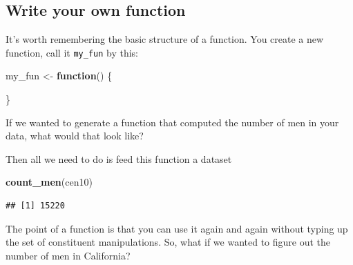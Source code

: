\documentclass[]{book}
\newenvironment{Shaded}{\begin{snugshade}}{\end{snugshade}}
\newcommand{\ControlFlowTok}[1]{\textcolor[rgb]{0.13,0.29,0.53}{\textbf{#1}}}
\newcommand{\KeywordTok}[1]{\textcolor[rgb]{0.13,0.29,0.53}{\textbf{#1}}}
\newcommand{\NormalTok}[1]{#1}
\newcommand{\OperatorTok}[1]{\textcolor[rgb]{0.81,0.36,0.00}{\textbf{#1}}}
\newcommand{\StringTok}[1]{\textcolor[rgb]{0.31,0.60,0.02}{#1}}
\theoremstyle{definition}
\theoremstyle{definition}
\theoremstyle{definition}
\theoremstyle{remark}
\begin{document}
\begin{Shaded}
\begin{Highlighting}[]
\begin{Shaded}
\begin{Highlighting}[]
\begin{Shaded}
\begin{Highlighting}[]
{\subsection{Write your own function}\label{write-your-own-function}}

It's worth remembering the basic structure of a function. You create a new function, call it \texttt{my\_fun} by this:

\begin{Shaded}
\begin{Highlighting}[]
\NormalTok{my_fun <-}\StringTok{ }\ControlFlowTok{function}\NormalTok{() \{}
  
\NormalTok{\}}
\end{Highlighting}
\end{Shaded}

If we wanted to generate a function that computed the number of men in your data, what would that look like?

\begin{Shaded}
\end{Shaded}

Then all we need to do is feed this function a dataset

\begin{Shaded}
\begin{Highlighting}[]
\KeywordTok{count_men}\NormalTok{(cen10)}
\end{Highlighting}
\end{Shaded}

\begin{verbatim}
## [1] 15220
\end{verbatim}

The point of a function is that you can use it again and again without typing up the set of constituent manipulations. So, what if we wanted to figure out the number of men in California?

\begin{Shaded}
\end{Shaded}


\end{Highlighting}
\end{Shaded}
\end{Highlighting}
\end{Shaded}
\end{Highlighting}
\end{Shaded}
\end{document}
